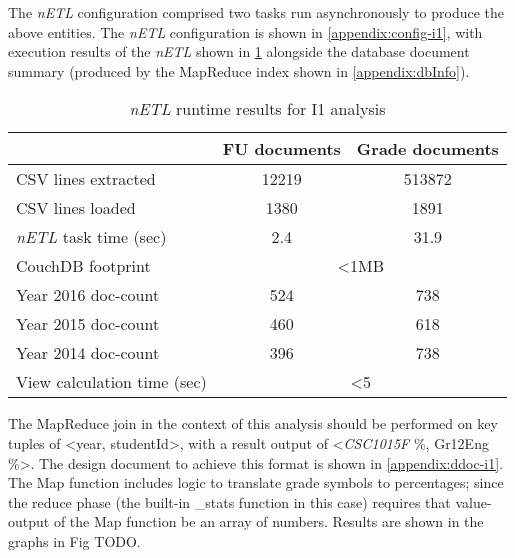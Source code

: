 The \textit{nETL} configuration comprised two tasks run asynchronously to produce the above entities. The \textit{nETL} configuration is shown in \ref{appendix:config-i1}, with execution results of the \textit{nETL} shown in \ref{i1-results} alongside the database document summary (produced by the MapReduce index shown in \ref{appendix:dbInfo}).

\begin{table}[]
    \centering
    \caption{\textit{nETL} runtime results for I1 analysis}
    \label{i1-results}
    \begin{tabular}{lcc}
                                      & FU documents                      & Grade documents \\ \hline
        CSV lines extracted           & 12219                             & 513872          \\
        CSV lines loaded              & 1380                              & 1891            \\
        \textit{nETL} task time (sec) & 2.4                               & 31.9            \\
        CouchDB footprint             & \multicolumn{2}{c}{\textless 1MB}                   \\
        Year 2016 doc-count           & 524                               & 738             \\
        Year 2015 doc-count           & 460                               & 618             \\
        Year 2014 doc-count           & 396                               & 738             \\
        View calculation time (sec)   & \multicolumn{2}{c}{\textless 5}                     \\
    \end{tabular}
\end{table}

The MapReduce join in the context of this analysis should be performed on key tuples of <year, studentId>, with a result output of <\textit{CSC1015F} \%, Gr12Eng \%>. The design document to achieve this format is shown in \ref{appendix:ddoc-i1}. The Map function includes logic to translate grade symbols to percentages; since the reduce phase (the built-in \_stats function in this case) requires that value-output of the Map function be an array of numbers. Results are shown in the graphs in Fig TODO.